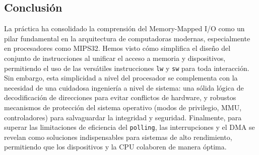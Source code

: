 \documentclass[12pt, a4paper]{article}
\begin{document}
\subsection*{Conclusión}
La práctica ha consolidado la comprensión del Memory-Mapped I/O como un pilar fundamental en la arquitectura de computadoras modernas, especialmente en procesadores como MIPS32. Hemos visto cómo simplifica el diseño del conjunto de instrucciones al unificar el acceso a memoria y dispositivos, permitiendo el uso de las versátiles instrucciones \texttt{lw} y \texttt{sw} para toda interacción. Sin embargo, esta simplicidad a nivel del procesador se complementa con la necesidad de una cuidadosa ingeniería a nivel de sistema: una sólida lógica de decodificación de direcciones para evitar conflictos de hardware, y robustos mecanismos de protección del sistema operativo (modos de privilegio, MMU, controladores) para salvaguardar la integridad y seguridad. Finalmente, para superar las limitaciones de eficiencia del \texttt{polling}, las interrupciones y el DMA se revelan como soluciones indispensables para sistemas de alto rendimiento, permitiendo que los dispositivos y la CPU colaboren de manera óptima.
\end{document}

